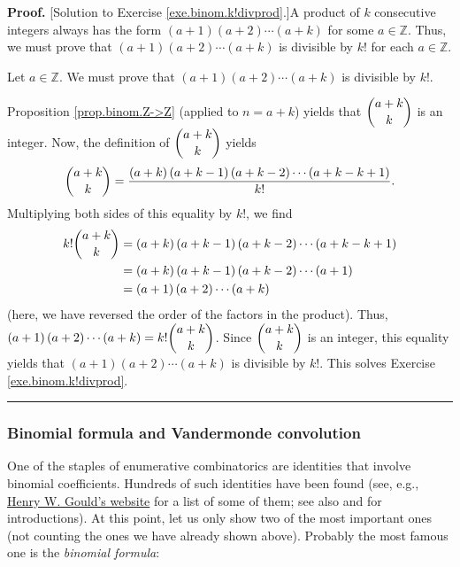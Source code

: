 \documentclass[numbers=enddot,12pt,final,onecolumn,notitlepage]{scrartcl}%
\numberwithin{exer}{subsection}
\theoremstyle{definition}
\newenvironment{fineprint}{\begin{small}}{\end{small}}
\newenvironment{proof}[1][Proof]{\noindent\textbf{#1.} }{\ \rule{0.5em}{0.5em}}
\begin{document}
\begin{fineprint}
\begin{proof}
[Solution to Exercise \ref{exe.binom.k!divprod}.]A product of $k$ consecutive
integers always has the form \newline$\left(  a+1\right)  \left(  a+2\right)
\cdots\left(  a+k\right)  $ for some $a\in\mathbb{Z}$. Thus, we must prove
that $\left(  a+1\right)  \left(  a+2\right)  \cdots\left(  a+k\right)  $ is
divisible by $k!$ for each $a\in\mathbb{Z}$.

Let $a\in\mathbb{Z}$. We must prove that $\left(  a+1\right)  \left(
a+2\right)  \cdots\left(  a+k\right)  $ is divisible by $k!$.

Proposition \ref{prop.binom.Z->Z} (applied to $n=a+k$) yields that
$\dbinom{a+k}{k}$ is an integer. Now, the definition of $\dbinom{a+k}{k}$
yields%
\[
\dbinom{a+k}{k}=\dfrac{\left(  a+k\right)  \left(  a+k-1\right)  \left(
a+k-2\right)  \cdots\left(  a+k-k+1\right)  }{k!}.
\]
Multiplying both sides of this equality by $k!$, we find%
\begin{align*}
k!\dbinom{a+k}{k}  &  =\left(  a+k\right)  \left(  a+k-1\right)  \left(
a+k-2\right)  \cdots\left(  a+k-k+1\right) \\
&  =\left(  a+k\right)  \left(  a+k-1\right)  \left(  a+k-2\right)
\cdots\left(  a+1\right) \\
&  =\left(  a+1\right)  \left(  a+2\right)  \cdots\left(  a+k\right)
\end{align*}
(here, we have reversed the order of the factors in the product). Thus,
$\left(  a+1\right)  \left(  a+2\right)  \cdots\left(  a+k\right)
=k!\dbinom{a+k}{k}$. Since $\dbinom{a+k}{k}$ is an integer, this equality
yields that $\left(  a+1\right)  \left(  a+2\right)  \cdots\left(  a+k\right)
$ is divisible by $k!$. This solves Exercise \ref{exe.binom.k!divprod}.
\end{proof}
\end{fineprint}

\subsubsection{Binomial formula and Vandermonde convolution}

One of the staples of enumerative combinatorics are identities that involve
binomial coefficients. Hundreds of such identities have been found (see, e.g.,
\href{http://www.math.wvu.edu/~gould/}{Henry W. Gould's website} for a list of
some of them; see also \cite[Chapter 5]{GKP} and \cite[Chapter 3]{detnotes}
for introductions). At this point, let us only show two of the most important
ones (not counting the ones we have already shown above). Probably the most
famous one is the \textit{binomial formula}:
\end{document}
